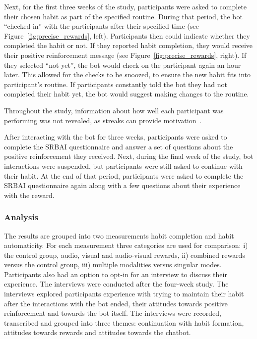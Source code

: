 \documentclass{scaffold/sigchi}
\begin{document}
Next, for the first three weeks of the study, participants were asked to complete their chosen habit as part of the specified routine. During that period, the bot ``checked in'' with the participants after their specified time (see Figure~\ref{fig:precise_rewards}, left). Participants then could indicate whether they completed the habit or not. If they reported habit completion, they would receive their positive reinforcement message (see Figure~\ref{fig:precise_rewards}, right). If they selected ``not yet'', the bot would check on the participant again an hour later. This allowed for the checks to be snoozed, to ensure the new habit fits into participant's routine. If participants constantly told the bot they had not completed their habit yet, the bot would suggest making changes to the routine.

Throughout the study, information about how well each participant was performing was not revealed, as streaks can provide motivation~\cite{article_dont_kick_habit}. 

After interacting with the bot for three weeks, participants were asked to complete the SRBAI questionnaire and answer a set of questions about the positive reinforcement they received. Next, during the final week of the study, bot interactions were suspended, but participants were still asked to continue with their habit. At the end of that period, participants were asked to complete the SRBAI questionnaire again along with a few questions about their experience with the reward. 

\subsubsection{Analysis}
The results are grouped into two measurements habit completion and habit automaticity. For each measurement three categories are used for comparison: i) the control group, audio, visual and audio-visual rewards, ii) combined rewards versus the control group, iii) multiple modalities versus singular modes. Participants also had an option to opt-in for an interview to discuss their experience. The interviews were conducted after the four-week study. The interviews explored participants experience with trying to maintain their habit after the interactions with the bot ended, their attitudes towards positive reinforcement and towards the bot itself. The interviews were recorded, transcribed and grouped into three themes: continuation with habit formation, attitudes towards rewards and attitudes towards the chatbot. 
\end{document}
